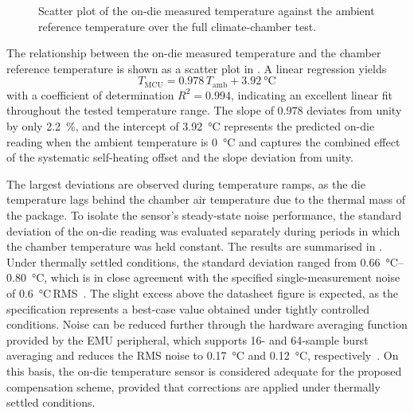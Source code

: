 \begin{figure}
    \centering
    
    \caption{Scatter plot of the on-die measured temperature against the ambient reference
             temperature over the full climate-chamber test.}
    \label{fig:temp_scatter}
\end{figure}

The relationship between the on-die measured temperature and the chamber reference temperature is shown as a scatter plot in . A linear regression yields
\begin{equation}
    T_{\mathrm{MCU}} = 0.978\,T_{\mathrm{amb}} + \SI{3.92}{\celsius}
    \label{eq:temp_fit}
\end{equation}
with a coefficient of determination $R^2 = 0.994$, indicating an excellent linear fit throughout the tested temperature range. The slope of $0.978$ deviates from unity by only \SI{2.2}{\percent}, and the intercept of \SI{3.92}{\celsius} represents the predicted on-die reading when the ambient temperature is \SI{0}{\celsius} and captures the combined effect of the systematic self-heating offset and the slope deviation from unity. %

The largest deviations are observed during temperature ramps, as the die temperature lags
behind the chamber air temperature due to the thermal mass of the package.
To isolate the sensor's steady-state noise performance, the standard deviation of the
on-die reading was evaluated separately during periods in which the chamber temperature
was held constant.
The results are summarised in .
Under thermally settled conditions, the standard deviation ranged from
\SIrange{0.66}{0.80}{\celsius}, which is in close agreement with the specified
single-measurement noise of \SI{0.6}{\celsius}\,RMS~\cite{EFR32MG22E}.
The slight excess above the datasheet figure is expected, as the specification represents
a best-case value obtained under tightly controlled conditions.
Noise can be reduced further through the hardware averaging function provided by the EMU
peripheral, which supports 16- and 64-sample burst averaging and reduces the RMS noise to
\SI{0.17}{\celsius} and \SI{0.12}{\celsius}, respectively~\cite{EFR32MG22E}.
On this basis, the on-die temperature sensor is considered adequate for the proposed
compensation scheme, provided that corrections are applied under thermally settled
conditions.


